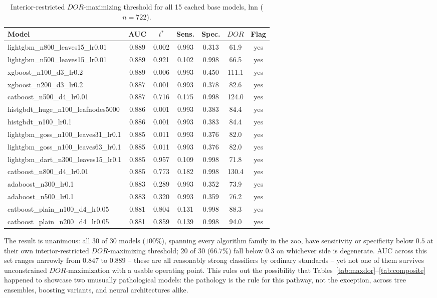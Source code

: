 \documentclass[11pt]{article}
\begin{document}
\begin{table}[ht]
\centering
\small
\caption{Interior-restricted $DOR$-maximizing threshold for all 15 cached base models, lnn ($n=722$).}
\label{tab:full-lnn}
\begin{tabular}{lcccccc}
\toprule
Model & AUC & $t^\ast$ & Sens. & Spec. & $DOR$ & Flag \\
\midrule
lightgbm\_n800\_leaves15\_lr0.01 & 0.889 & 0.002 & 0.993 & 0.313 & 61.9 & yes \\
lightgbm\_n500\_leaves15\_lr0.01 & 0.889 & 0.921 & 0.102 & 0.998 & 66.5 & yes \\
xgboost\_n100\_d3\_lr0.2 & 0.889 & 0.006 & 0.993 & 0.450 & 111.1 & yes \\
xgboost\_n200\_d3\_lr0.2 & 0.887 & 0.001 & 0.993 & 0.378 & 82.6 & yes \\
catboost\_n500\_d4\_lr0.01 & 0.887 & 0.716 & 0.175 & 0.998 & 124.0 & yes \\
histgbdt\_huge\_n100\_leafnodes5000 & 0.886 & 0.001 & 0.993 & 0.383 & 84.4 & yes \\
histgbdt\_n100\_lr0.1 & 0.886 & 0.001 & 0.993 & 0.383 & 84.4 & yes \\
lightgbm\_goss\_n100\_leaves31\_lr0.1 & 0.885 & 0.011 & 0.993 & 0.376 & 82.0 & yes \\
lightgbm\_goss\_n100\_leaves63\_lr0.1 & 0.885 & 0.011 & 0.993 & 0.376 & 82.0 & yes \\
lightgbm\_dart\_n300\_leaves15\_lr0.1 & 0.885 & 0.957 & 0.109 & 0.998 & 71.8 & yes \\
catboost\_n800\_d4\_lr0.01 & 0.885 & 0.773 & 0.182 & 0.998 & 130.4 & yes \\
adaboost\_n300\_lr0.1 & 0.883 & 0.289 & 0.993 & 0.352 & 73.9 & yes \\
adaboost\_n500\_lr0.1 & 0.883 & 0.320 & 0.993 & 0.359 & 76.2 & yes \\
catboost\_plain\_n100\_d4\_lr0.05 & 0.881 & 0.804 & 0.131 & 0.998 & 88.3 & yes \\
catboost\_plain\_n200\_d4\_lr0.05 & 0.881 & 0.859 & 0.139 & 0.998 & 94.0 & yes \\
\bottomrule
\end{tabular}
\end{table}

The result is unanimous: all $30$ of $30$ models ($100\%$), spanning every
algorithm family in the zoo, have sensitivity or specificity below $0.5$ at
their own interior-restricted $DOR$-maximizing threshold; $20$ of $30$
($66.7\%$) fall below $0.3$ on whichever side is degenerate. AUC across
this set ranges narrowly from $0.847$ to $0.889$ -- these are all
reasonably strong classifiers by ordinary standards -- yet not one of them
survives unconstrained $DOR$-maximization with a usable operating point.
This rules out the possibility that Tables~\ref{tab:maxdor}--\ref{tab:composite}
happened to showcase two unusually pathological models: the pathology is
the rule for this pathway, not the exception, across tree ensembles,
boosting variants, and neural architectures alike.
\end{document}
